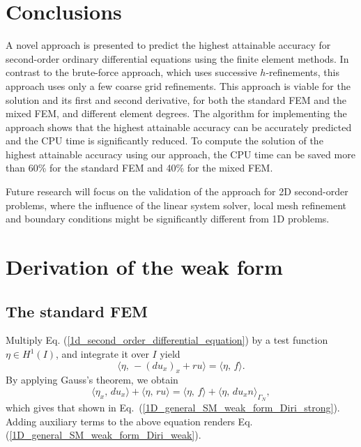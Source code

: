 \documentclass[review,3p]{elsarticle}
\begin{document}
\section{Conclusions}		\label{paragraph on conclusion}

A novel approach is presented to predict the highest attainable accuracy for second-order ordinary differential equations using the finite element methods.
In contrast to the brute-force approach, which uses successive $h$-refinements, this approach uses only a few coarse grid refinements. 
This approach is viable for the solution and its first and second derivative, for both the standard FEM and the mixed FEM, and different element degrees.
The algorithm for implementing the approach shows that the highest attainable accuracy can be accurately predicted and the CPU time is significantly reduced.
To compute the solution of the highest attainable accuracy using our approach, the CPU time can be saved more than 60\% for the standard FEM and 40\% for the mixed FEM.

Future research will focus on the validation of the approach for 2D second-order problems, where the influence of the linear system solver, local mesh refinement and boundary conditions might be significantly different from 1D problems. 

\appendix

\section{Derivation of the weak form}		\label{weak form appendix}

\subsection{The standard FEM}		\label{derivation_weak_form_SM}

Multiply Eq. (\ref{1d_second_order_differential_equation}) by a test function $\eta \in H ^1 (I)$, and integrate it over $I$ yield
\begin{equation}
\langle \eta, \, -\left( d u_x \right)_x + ru \rangle = \langle \eta, \, f \rangle. \label{1D_general_inte}
\end{equation}
By applying Gauss's theorem, we obtain
\begin{equation}
 \langle {\eta} _x, \, d u_x \rangle + \langle \eta, \, ru \rangle = \langle \eta, \, f \rangle + \langle \eta, \, d u_x n \rangle_{ {\Gamma_N}},		\label{1D_general_gauss}
\end{equation}
which gives that shown in Eq.~({\ref{1D_general_SM_weak_form_Diri_strong}}). Adding auxiliary terms to the above equation renders Eq. (\ref{1D_general_SM_weak_form_Diri_weak}).
\end{document}
